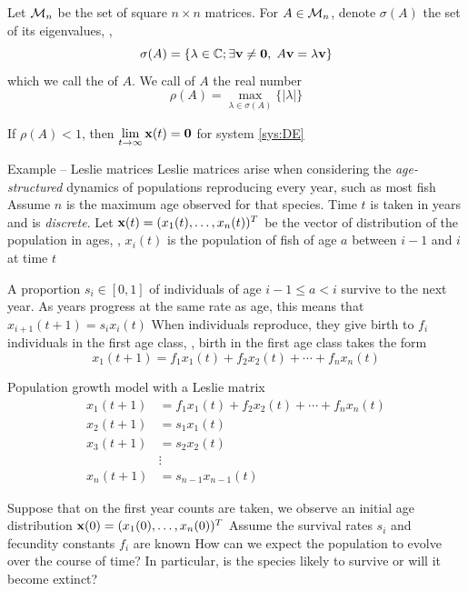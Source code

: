 \documentclass[aspectratio=169]{beamer}
\begin{document}
\begin{frame}
\begin{definition}
Let $\mathcal{M}_n$ be the set of square $n\times n$ matrices. For $A\in\mathcal{M}_n$, denote $\sigma(A)$ the set of its eigenvalues, \ie,
\[
\sigma(A)=\left\{
\lambda\in\IC; \exists \bv\neq \b0,\; A\bv=\lambda \bv
\right\}
\]
which we call the  of $A$. We call  of $A$ the real number
\[
\rho(A)=\max_{\lambda\in\sigma(A)}\{|\lambda|\}
\]
\end{definition}
\vfill
\begin{theorem}\label{th:matrix_everywhere_rho_l_1_goes0}
If $\rho(A)<1$, then $\lim\limits_{t\to \infty} \bx(t)=\b0$ for system \eqref{sys:DE}
\end{theorem}
\end{frame}


\begin{frame}{Example -- Leslie matrices}
Leslie matrices arise when considering the \emph{age-structured} dynamics of populations reproducing every year, such as most fish
\vfill
Assume $n$ is the maximum age observed for that species. Time $t$ is taken in years and is \emph{discrete}.
Let $\mathbf{x}(t)=(x_1(t),\ldots,x_n(t))^T$ be the vector of distribution of the population in ages, \ie, $x_i(t)$ is the population of fish of age $a$ between $i-1$ and $i$ at time $t$
\vfill


A proportion $s_i\in[0,1]$ of individuals of age $i-1\leq a<i$ survive to the next year. As years progress at the same rate as age, this means that $x_{i+1}(t+1) = s_i x_i(t)$
\vfill
When individuals reproduce, they give birth to $f_i$ individuals in the first age class, \ie, birth in the first age class takes the form
\[
x_1(t+1)=f_1x_1(t)+f_2x_2(t)+\cdots+f_nx_n(t)
\]
\end{frame}

\begin{frame}{Population growth model with a Leslie matrix}
\begin{align*}
 x_1(t+1) &= f_1x_1(t)+f_2x_2(t)+\cdots+f_nx_n(t) \\
 x_2(t+1) &= s_1x_1(t) \\
 x_3(t+1) &= s_2x_2(t) \\
 &\vdots \\
 x_n(t+1) &= s_{n-1}x_{n-1}(t)
\end{align*}
\end{frame}

\begin{frame}
Suppose that on the first year counts are taken, we observe an initial age distribution $\mathbf{x}(0)=(x_1(0),\ldots,x_n(0))^T$
\vfill
Assume the survival rates $s_i$ and fecundity constants $f_i$ are known
\vfill
How can we expect the population to evolve over the course of time? In particular, is the species likely to survive or will it become extinct?
\end{frame}
\end{document}
